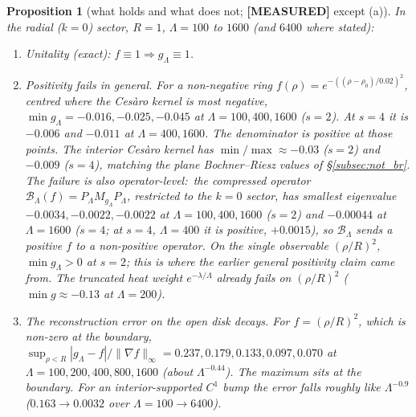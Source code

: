 \documentclass[11pt,a4paper]{article}
\theoremstyle{plain}
\newtheorem{proposition}[theorem]{Proposition}
\theoremstyle{definition}
\newcommand{\Berez}{\mathcal{B}}
\newcommand{\supnorm}[1]{\lVert #1 \rVert_{\infty}}
\begin{document}
\begin{proposition}[what holds and what does not; \textbf{[MEASURED]}
except (a)]\label{prop:disk}
In the radial ($k=0$) sector, $R=1$, $\Lambda=100$ to $1600$ (and
$6400$ where stated):
\begin{enumerate}
\item[(a)] \emph{Unitality} (exact): $f\equiv1\Rightarrow g_{\Lambda}\equiv1$.
\item[(b)] \emph{Positivity fails in general.} For a non-negative ring
$f(\rho)=e^{-((\rho-\rho_{0})/0.02)^{2}}$, centred where the Ces\`aro
kernel is most negative, $\min g_{\Lambda}=-0.016,-0.025,-0.045$ at
$\Lambda=100,400,1600$ ($s=2$). At $s=4$ it is $-0.006$ and $-0.011$ at
$\Lambda=400,1600$. The denominator is positive at those points. The
interior Ces\`aro kernel has $\min/\max\approx-0.03$ ($s=2$) and
$-0.009$ ($s=4$), matching the plane Bochner--Riesz values of
\S\ref{subsec:not_br}. The failure is also operator-level:\ the
compressed operator $\Berez_{\Lambda}(f)=P_{\Lambda}M_{g_{\Lambda}}P_{\Lambda}$,
restricted to the $k=0$ sector, has smallest eigenvalue
$-0.0034,-0.0022,-0.0022$ at $\Lambda=100,400,1600$ ($s=2$) and $-0.00044$
at $\Lambda=1600$ ($s=4$; at $s=4$, $\Lambda=400$ it is positive,
$+0.0015$), so $\Berez_{\Lambda}$ sends a positive $f$ to a non-positive
operator. On the single observable $(\rho/R)^{2}$, $\min
g_{\Lambda}>0$ at $s=2$; this is where the earlier general positivity
claim came from. The truncated heat weight $e^{-\lambda/\Lambda}$ already
fails on $(\rho/R)^{2}$ ($\min g\approx-0.13$ at $\Lambda=200$).
\item[(c)] \emph{The reconstruction error on the open disk decays.} For
$f=(\rho/R)^{2}$, which is non-zero at the boundary,
$\sup_{\rho<R}|g_{\Lambda}-f|/\supnorm{\nabla f}=0.237,0.179,0.133,
0.097,0.070$ at $\Lambda=100,200,400,800,1600$ (about $\Lambda^{-0.44}$). The
maximum sits at the boundary. For an interior-supported $C^{1}$ bump the
error falls roughly like $\Lambda^{-0.9}$ ($0.163\to0.0032$ over
$\Lambda=100\to6400$).
\end{enumerate}
\end{proposition}
\end{document}

